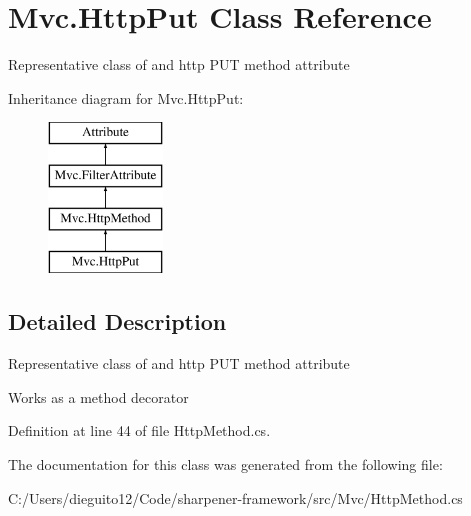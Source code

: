 \hypertarget{class_mvc_1_1_http_put}{}\section{Mvc.\+Http\+Put Class Reference}
\label{class_mvc_1_1_http_put}


Representative class of and http P\+UT method attribute  


Inheritance diagram for Mvc.\+Http\+Put\+:\begin{figure}[H]
\begin{center}
\leavevmode
\includegraphics[height=4.000000cm]{class_mvc_1_1_http_put}
\end{center}
\end{figure}


\subsection{Detailed Description}
Representative class of and http P\+UT method attribute 

Works as a method decorator

Definition at line 44 of file Http\+Method.\+cs.



The documentation for this class was generated from the following file\+:\begin{DoxyCompactItemize}
\item 
C\+:/\+Users/dieguito12/\+Code/sharpener-\/framework/src/\+Mvc/Http\+Method.\+cs\end{DoxyCompactItemize}
